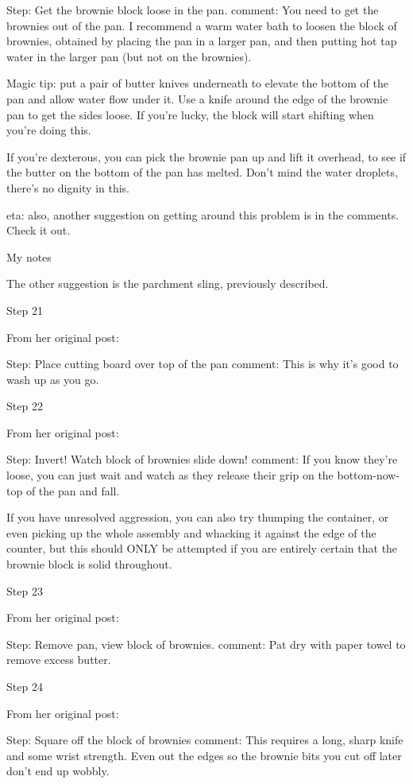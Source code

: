 Step: Get the brownie block loose in the pan.
comment: You need to get the brownies out of the pan. I recommend a warm water bath to loosen the block of brownies, obtained by placing the pan in a larger pan, and then putting hot tap water in the larger pan (but not on the brownies).

Magic tip: put a pair of butter knives underneath to elevate the bottom of the pan and allow water flow under it. Use a knife around the edge of the brownie pan to get the sides loose. If you're lucky, the block will start shifting when you're doing this.

If you're dexterous, you can pick the brownie pan up and lift it overhead, to see if the butter on the bottom of the pan has melted. Don't mind the water droplets, there's no dignity in this.

eta: also, another suggestion on getting around this problem is in the comments. Check it out.

My notes

The other suggestion is the parchment sling, previously described.

Step 21

From her original post:

Step: Place cutting board over top of the pan
comment: This is why it's good to wash up as you go.

Step 22

From her original post:

Step: Invert! Watch block of brownies slide down!
comment: If you know they're loose, you can just wait and watch as they release their grip on the bottom-now-top of the pan and fall.

If you have unresolved aggression, you can also try thumping the container, or even picking up the whole assembly and whacking it against the edge of the counter, but this should ONLY be attempted if you are entirely certain that the brownie block is solid throughout.

Step 23

From her original post:

Step: Remove pan, view block of brownies.
comment: Pat dry with paper towel to remove excess butter.

Step 24

From her original post:

Step: Square off the block of brownies
comment: This requires a long, sharp knife and some wrist strength. Even out the edges so the brownie bits you cut off later don't end up wobbly.

